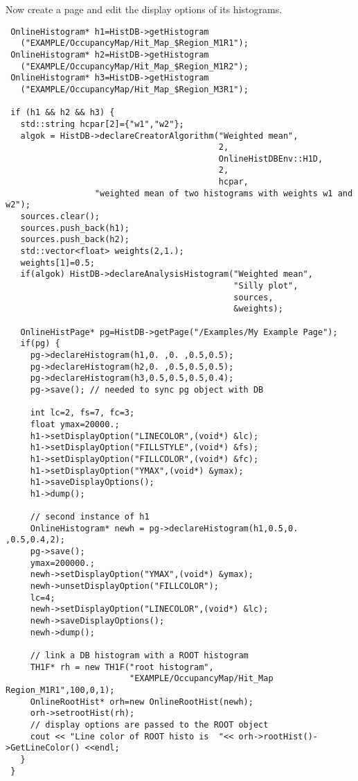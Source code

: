 \documentclass{lhcbnote}
\begin{document}
Now create a page and edit the display options of its
histograms. 
\begin{verbatim}
 OnlineHistogram* h1=HistDB->getHistogram
   ("EXAMPLE/OccupancyMap/Hit_Map_$Region_M1R1");
 OnlineHistogram* h2=HistDB->getHistogram
   ("EXAMPLE/OccupancyMap/Hit_Map_$Region_M1R2");
 OnlineHistogram* h3=HistDB->getHistogram
   ("EXAMPLE/OccupancyMap/Hit_Map_$Region_M3R1");

 if (h1 && h2 && h3) {
   std::string hcpar[2]={"w1","w2"};
   algok = HistDB->declareCreatorAlgorithm("Weighted mean",
                                           2,
                                           OnlineHistDBEnv::H1D,
                                           2,
                                           hcpar,
                  "weighted mean of two histograms with weights w1 and w2");
   sources.clear();
   sources.push_back(h1);
   sources.push_back(h2);
   std::vector<float> weights(2,1.);
   weights[1]=0.5;
   if(algok) HistDB->declareAnalysisHistogram("Weighted mean",
                                              "Silly plot",
                                              sources,
                                              &weights);

   OnlineHistPage* pg=HistDB->getPage("/Examples/My Example Page");
   if(pg) {
     pg->declareHistogram(h1,0. ,0. ,0.5,0.5);
     pg->declareHistogram(h2,0. ,0.5,0.5,0.5);
     pg->declareHistogram(h3,0.5,0.5,0.5,0.4);
     pg->save(); // needed to sync pg object with DB
   
     int lc=2, fs=7, fc=3;
     float ymax=20000.;
     h1->setDisplayOption("LINECOLOR",(void*) &lc);
     h1->setDisplayOption("FILLSTYLE",(void*) &fs);
     h1->setDisplayOption("FILLCOLOR",(void*) &fc); 
     h1->setDisplayOption("YMAX",(void*) &ymax); 
     h1->saveDisplayOptions();
     h1->dump();

     // second instance of h1
     OnlineHistogram* newh = pg->declareHistogram(h1,0.5,0. ,0.5,0.4,2);
     pg->save();
     ymax=200000.;
     newh->setDisplayOption("YMAX",(void*) &ymax); 
     newh->unsetDisplayOption("FILLCOLOR");
     lc=4;
     newh->setDisplayOption("LINECOLOR",(void*) &lc);
     newh->saveDisplayOptions();
     newh->dump();

     // link a DB histogram with a ROOT histogram
     TH1F* rh = new TH1F("root histogram",
                         "EXAMPLE/OccupancyMap/Hit_Map Region_M1R1",100,0,1);
     OnlineRootHist* orh=new OnlineRootHist(newh);
     orh->setrootHist(rh);
     // display options are passed to the ROOT object
     cout << "Line color of ROOT histo is  "<< orh->rootHist()->GetLineColor() <<endl;
   }
 }
\end{verbatim}
\end{document}
